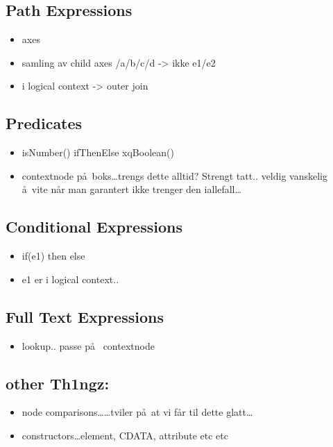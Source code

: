 \subsection{Path Expressions}
\label{sect:trans:TD:pathExprs}
\begin{itemize}
  \item axes
  \item samling av child axes /a/b/c/d -> ikke e1/e2
  \item i logical context -> outer join
\end{itemize}

\subsection{Predicates}
\label{sect:trans:TD:predicates}
\begin{itemize}
  \item isNumber() ifThenElse xqBoolean()
  \item contextnode p\aa~boks\ldots trengs dette alltid? Strengt tatt.. veldig vanskelig \aa~vite n\aa r man
  garantert ikke trenger den iallefall\ldots
\end{itemize}

\subsection{Conditional Expressions}
\label{sect:trans:TD:ifThenElse}
\begin{itemize}
  \item if(e1) then else
  \item e1 er i logical context..
\end{itemize}

\subsection{Full Text Expressions}
\label{sect:trans:TD:fulltext}
\begin{itemize}
  \item lookup.. passe p\aa~ contextnode
\end{itemize}

\subsection{other Th1ngz:}
\begin{itemize}
  \item node comparisons\ldots\ldots tviler p\aa~at vi f\aa r til dette glatt\ldots
  \item constructors\ldots element, CDATA, attribute etc etc
\end{itemize}



